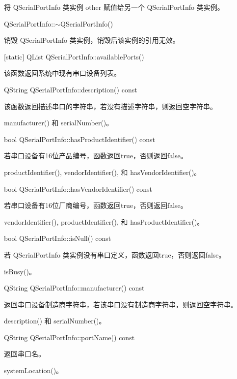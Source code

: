 将 QSerialPortInfo 类实例 other 赋值给另一个 QSerialPortInfo 类实例。

QSerialPortInfo::$\sim$QSerialPortInfo()

销毁 QSerialPortInfo 类实例，销毁后该实例的引用无效。

[static] QList QSerialPortInfo::availablePorts()

该函数返回系统中现有串口设备列表。

QString QSerialPortInfo::description() const

该函数返回描述串口的字符串，若没有描述字符串，则返回空字符串。

\begin{seeAlso}
manufacturer() 和 serialNumber()。
\end{seeAlso}

bool QSerialPortInfo::hasProductIdentifier() const

若串口设备有16位产品编号，函数返回true，否则返回false。

\begin{seeAlso}
productIdentifier(), vendorIdentifier(), 和 hasVendorIdentifier()。
\end{seeAlso}

bool QSerialPortInfo::hasVendorIdentifier() const

若串口设备有16位厂商编号，函数返回true，否则返回false。

\begin{seeAlso}
vendorIdentifier(), productIdentifier(), 和 hasProductIdentifier()。
\end{seeAlso}

bool QSerialPortInfo::isNull() const

若 QSerialPortInfo 类实例没有串口定义，函数返回true，否则返回false。

\begin{seeAlso}
isBusy()。
\end{seeAlso}

QString QSerialPortInfo::manufacturer() const

返回串口设备制造商字符串，若该串口没有制造商字符串，则返回空字符串。

\begin{seeAlso}
description() 和 serialNumber()。
\end{seeAlso}

QString QSerialPortInfo::portName() const

返回串口名。

\begin{seeAlso}
systemLocation()。
\end{seeAlso}


